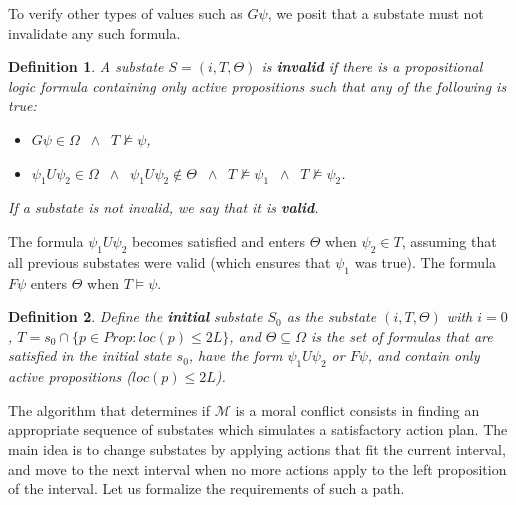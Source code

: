 \documentclass[a4paper,fleqn]{cas-dc}
\newtheorem{Definition}{Definition}
\begin{document}

To verify other types of values such as $G\psi$, we posit that a substate must not invalidate any such formula.

\begin{Definition}\label{invalid}
A substate $S = (i, T, \Theta)$ is {\bf invalid} if there is a propositional logic formula
containing only active propositions such that any of the following is true: 
\begin{itemize}
    \item $G\psi\in\Omega\;\;\land\;\; T\not\models\psi$,
    \item $\psi_1 U \psi_2 \in\Omega\;\;\land\;\; \psi_1 U\psi_2 \notin \Theta \;\;\land\;\; T\not\models \psi_1 \;\;\land\; \;T\not\models\psi_2$.
\end{itemize}
If a substate is not invalid, we say that it is {\bf valid}.
\end{Definition}

The formula $\psi_1 U \psi_2$ becomes satisfied and enters $\Theta$ when 
$\psi_2\in T$, assuming that all previous substates were valid (which ensures that $\psi_1$ was true).
The formula $F\psi$ enters $\Theta$ when $T\models \psi$.

\begin{Definition}
 Define the {\bf initial} substate $S_0$ as the substate $(i,T,\Theta)$ with $i=0$, 
$T=s_0 \cap \{p\in Prop : loc(p)\le 2L\}$, and $\Theta\subseteq \Omega$ is the set of
    formulas that are satisfied in the initial state $s_0$, have the form $\psi_1 U \psi_2$ or $F\psi$, and contain only active propositions ($loc(p)\le 2L$).
\end{Definition}

The algorithm that determines if $\mathcal{M}$ is a moral conflict consists in finding an appropriate sequence
of substates which simulates a satisfactory action plan. The main idea is to change substates by applying actions that fit the current interval, and move to the next interval when no more actions apply to the left proposition of the interval. Let us formalize the requirements of such a path.
\end{document}

